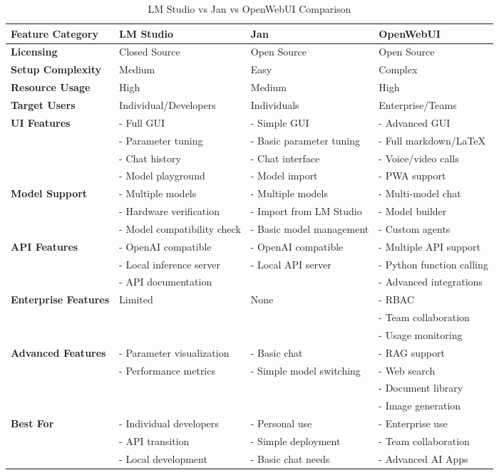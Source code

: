 \begin{table*}[h!]
\centering
\caption{LM Studio vs Jan vs OpenWebUI Comparison}
\label{tab:feature-comparison-ui}
\begin{tabular}{llll}
\toprule
Feature Category & LM Studio & Jan & OpenWebUI \\
\midrule
\textbf{Licensing} & Closed Source & Open Source & Open Source \\
\textbf{Setup Complexity} & Medium & Easy & Complex \\
\textbf{Resource Usage} & High & Medium & High \\
\textbf{Target Users} & Individual/Developers & Individuals & Enterprise/Teams \\
\textbf{UI Features} & - Full GUI & - Simple GUI & - Advanced GUI \\
& - Parameter tuning & - Basic parameter tuning & - Full markdown/LaTeX \\
& - Chat history & - Chat interface & - Voice/video calls \\
& - Model playground & - Model import & - PWA support \\
\textbf{Model Support} & - Multiple models & - Multiple models & - Multi-model chat \\
& - Hardware verification & - Import from LM Studio & - Model builder \\
& - Model compatibility check & - Basic model management & - Custom agents \\
\textbf{API Features} & - OpenAI compatible & - OpenAI compatible & - Multiple API support \\
& - Local inference server & - Local API server & - Python function calling \\
& - API documentation & & - Advanced integrations \\
\textbf{Enterprise Features} & Limited & None & - RBAC \\
& & & - Team collaboration \\
& & & - Usage monitoring \\
\textbf{Advanced Features} & - Parameter visualization & - Basic chat & - RAG support \\
& - Performance metrics & - Simple model switching & - Web search \\
& & & - Document library \\
& & & - Image generation \\
\textbf{Best For} & - Individual developers & - Personal use & - Enterprise use \\
& - API transition & - Simple deployment & - Team collaboration \\
& - Local development & - Basic chat needs & - Advanced AI Apps \\
\bottomrule
\end{tabular}
\end{table*}


